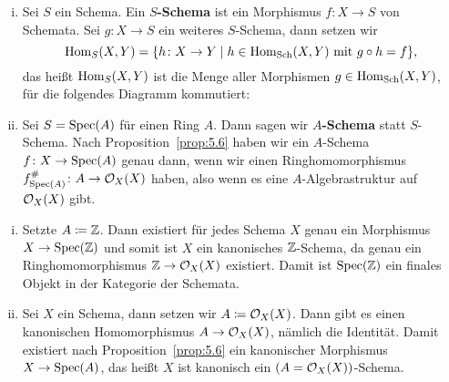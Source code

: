 \begin{defn}
\label{defn:5.7}
	\begin{enumerate}[i)]
		\item Sei $S$ ein Schema. Ein $S$\textbf{-Schema} ist ein Morphismus $f\colon X \to S$ von Schemata. Sei $g\colon X \to S$ ein weiteres $S$-Schema, dann setzen wir
		\[
			\operatorname{Hom}_{S}(X,Y)=\{h\colon X\to Y\mid h \in \operatorname{Hom}_{\operatorname{Sch}}(X,Y) \text{ mit } g \circ h = f\},
		\]
		das heißt $\operatorname{Hom}_{S}(X,Y)$ ist die Menge aller Morphismen $g \in \operatorname{Hom}_{\operatorname{Sch}}(X,Y)$, für die folgendes Diagramm kommutiert:
		\begin{center}
		\end{center}
		\item Sei $S=\operatorname{Spec}(A)$ für einen Ring $A$. Dann sagen wir $A$\textbf{-Schema} statt $S$-Schema.	Nach Proposition~\ref{prop:5.6} haben wir ein $A$-Schema $f \colon X \to \operatorname{Spec}(A)$ genau dann, wenn wir einen Ringhomomorphismus $f^{\#}_{\operatorname{Spec}(A)}\colon A \to \mathcal{O}_X(X)$ haben, also wenn es eine $A$-Algebrastruktur auf $\mathcal{O}_X(X)$ gibt.
	\end{enumerate}
\end{defn}

\begin{bsp}
\label{bsp:5.8}
	\begin{enumerate}[i)]
		\item Setzte $A \coloneqq \mathbb {Z}$. Dann existiert für jedes Schema $X$ genau ein Morphismus $X \to \operatorname{Spec}(\mathbb {Z})$ und somit ist $X$ ein kanonisches $\mathbb {Z}$-Schema, da genau ein Ringhomomorphismus $\mathbb {Z} \to \mathcal{O}_X(X)$ existiert. Damit ist $\operatorname{Spec}(\mathbb {Z})$ ein finales Objekt in der Kategorie der Schemata.
		\item Sei $X$ ein Schema, dann setzen wir $A \coloneqq \mathcal{O}_X(X)$. Dann gibt es einen kanonischen Homomorphismus $A \to \mathcal{O}_X(X)$, nämlich die Identität. Damit existiert nach Proposition~\ref{prop:5.6} ein kanonischer Morphismus $X \to \operatorname{Spec}(A)$, das heißt $X$ ist kanonisch ein $(A=\mathcal{O}_X(X))$-Schema.
	\end{enumerate}
\end{bsp}

